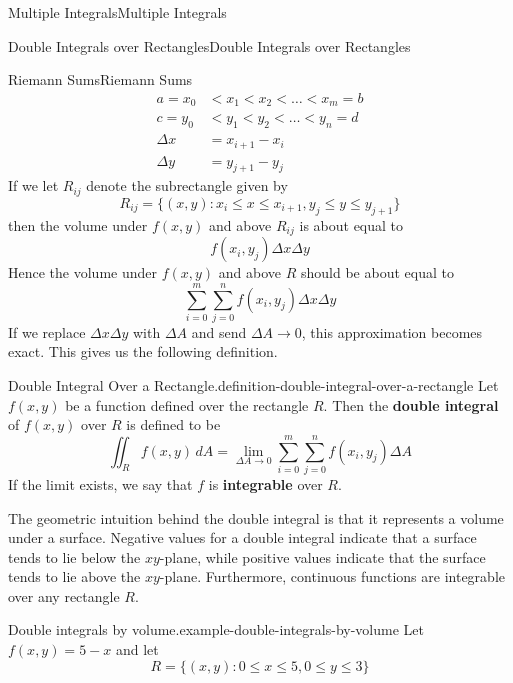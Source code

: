 \documentclass[10pt,]{book}
\newcommand{\terminology}[1]{\textbf{#1}}
\numberwithin{equation}{section}
\begin{document}
\begin{chapterptx}{Multiple Integrals}{}{Multiple Integrals}{}{}
\begin{sectionptx}{Double Integrals over Rectangles}{}{Double Integrals over Rectangles}{}{}
\begin{subsectionptx}{Riemann Sums}{}{Riemann Sums}{}{}
\begin{align*}
a = x_{0} & < x_{1} < x_{2} < \dots < x_{m} = b \\
c = y_{0} & < y_{1} < y_{2} < \dots < y_{n} = d \\
\Delta x & = x_{i+1} - x_{i} \\
\Delta y & = y_{j+1} - y_{j} 
\end{align*}
If we let \(R_{ij}\) denote the subrectangle given by%
\begin{equation*}
R_{ij} = \{(x,y) : x_{i}\leq x\leq x_{i+1}, y_{j}\leq y\leq y_{j+1}\}
\end{equation*}
then the volume under \(f(x,y)\) and above \(R_{ij}\) is about equal to%
\begin{equation*}
f(x_{i},y_{j})\Delta x\Delta y
\end{equation*}
Hence the volume under \(f(x,y)\) and above \(R\) should be about equal to%
\begin{equation*}
\sum_{i=0}^{m}\sum_{j=0}^{n}f(x_{i},y_{j})\Delta x\Delta y
\end{equation*}
If we replace \(\Delta x\Delta y\) with \(\Delta A\) and send \(\Delta A\to0\), this approximation becomes exact. This gives us the following definition.%
\begin{definition}{Double Integral Over a Rectangle.}{definition-double-integral-over-a-rectangle}%
\hypertarget{p-1242}{}%
Let \(f(x,y)\) be a function defined over the rectangle \(R\). Then the \terminology{double integral} of \(f(x,y)\) over \(R\) is defined to be%
\begin{equation*}
\iint_{R}f(x,y)\,dA = \lim_{\Delta A\to0}\sum_{i=0}^{m}\sum_{j=0}^{n}f(x_{i},y_{j})\Delta A
\end{equation*}
If the limit exists, we say that \(f\) is \terminology{integrable} over \(R\).%
\end{definition}
\hypertarget{p-1243}{}%
The geometric intuition behind the double integral is that it represents a volume under a surface. Negative values for a double integral indicate that a surface tends to lie below the \(xy\)-plane, while positive values indicate that the surface tends to lie above the \(xy\)-plane. Furthermore, continuous functions are integrable over any rectangle \(R\).%
\begin{example}{Double integrals by volume.}{example-double-integrals-by-volume}%
\hypertarget{p-1244}{}%
Let \(f(x,y) = 5 - x\) and let%
\begin{equation*}
R = \{(x,y) : 0\leq x\leq 5, 0\leq y\leq 3\}
\end{equation*}

\end{example}
\end{subsectionptx}
\end{sectionptx}
\end{chapterptx}
\end{document}

